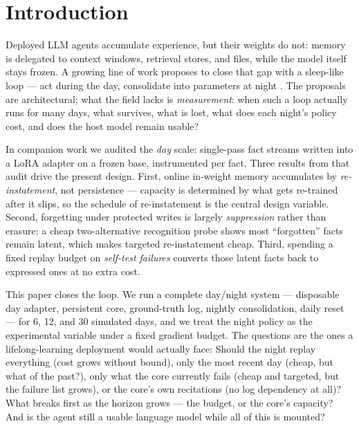 \documentclass[11pt]{article}
\begin{document}
\section{Introduction}

Deployed LLM agents accumulate experience, but their weights do not: memory is delegated to context
windows, retrieval stores, and files, while the model itself stays frozen. A growing line of work
proposes to close that gap with a sleep-like loop --- act during the day, consolidate into parameters
at night \citep{letThemSleep2026,scm2026,behrouz2024titans}. The proposals are architectural; what
the field lacks is \emph{measurement}: when such a loop actually runs for many days, what survives,
what is lost, what does each night's policy cost, and does the host model remain usable?

In companion work \citep{lin2026persistence} we audited the \emph{day} scale: single-pass fact
streams written into a LoRA adapter on a frozen base, instrumented per fact. Three results from that
audit drive the present design. First, online in-weight memory accumulates by
\emph{re-instatement}, not persistence --- capacity is determined by what gets re-trained after it
slips, so the schedule of re-instatement is the central design variable. Second, forgetting under
protected writes is largely \emph{suppression} rather than erasure: a cheap two-alternative
recognition probe shows most ``forgotten'' facts remain latent, which makes targeted re-instatement
cheap. Third, spending a fixed replay budget on \emph{self-test failures} converts those latent
facts back to expressed ones at no extra cost.

This paper closes the loop. We run a complete day/night system --- disposable day adapter, persistent
core, ground-truth log, nightly consolidation, daily reset --- for 6, 12, and 30 simulated days, and
we treat the night policy as the experimental variable under a fixed gradient budget. The questions
are the ones a lifelong-learning deployment would actually face: Should the night replay everything
(cost grows without bound), only the most recent day (cheap, but what of the past?), only what the
core currently fails (cheap and targeted, but the failure list grows), or the core's own recitations
(no log dependency at all)? What breaks first as the horizon grows --- the budget, or the core's
capacity? And is the agent still a usable language model while all of this is mounted?
\end{document}
